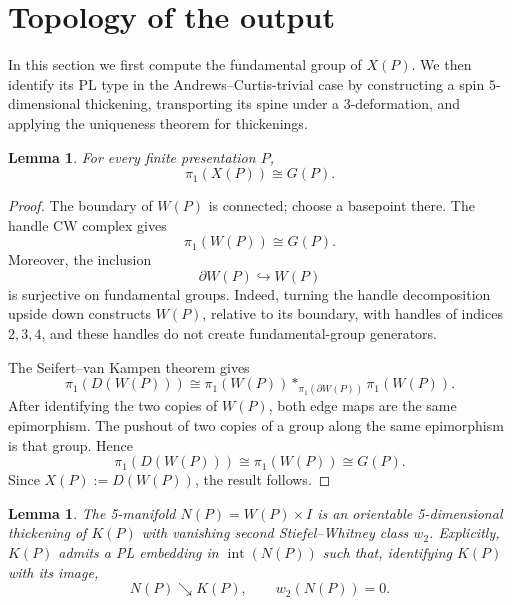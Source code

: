\documentclass[a4paper,11pt,reqno]{amsart}
\newtheorem{lemma}[theorem]{Lemma}
\theoremstyle{definition}
\theoremstyle{remark}
\begin{document}
	\section{Topology of the output}
	\label{sec:output-topology}
	
	In this section we first compute the fundamental group of $X(P)$. We then identify its PL type in the Andrews–Curtis-trivial case by constructing a spin $5$-dimensional thickening, transporting its spine under a $3$-deformation, and applying the uniqueness theorem for thickenings.
	
	\begin{lemma}
		\label{lem:pi1-double}
		For every finite presentation $P$,
		\[
		\pi_1(X(P))\cong G(P).
		\]
	\end{lemma}
	
	\begin{proof}
		The boundary of $W(P)$ is connected; choose a basepoint there. The handle
		CW complex gives
		\[
		\pi_1(W(P))\cong G(P).
		\]
		Moreover, the inclusion
		\[
		\partial W(P)\hookrightarrow W(P)
		\]
		is surjective on fundamental groups. Indeed, turning the handle decomposition
		upside down constructs $W(P)$, relative to its boundary, with handles of
		indices $2,3,4$, and these handles do not create fundamental-group
		generators.
		
		The Seifert--van Kampen theorem gives
		\[
		\pi_1(D(W(P)))
		\cong
		\pi_1(W(P))*_{\pi_1(\partial W(P))}\pi_1(W(P)).
		\]
		After identifying the two copies of $W(P)$, both edge maps are the same
		epimorphism. The pushout of two copies of a group along the same epimorphism
		is that group. Hence
		\[
		\pi_1(D(W(P)))\cong\pi_1(W(P))\cong G(P).
		\]
		Since $X(P):=D(W(P))$, the result follows.
	\end{proof}
	
	\begin{lemma}
		\label{lem:zero-w2-product}
		The 5-manifold $N(P)=W(P)\times I$ is an orientable 5-dimensional thickening of $K(P)$ with vanishing second Stiefel--Whitney class $w_2$. Explicitly, $K(P)$ admits a PL embedding in $\operatorname{int}(N(P))$ such that, identifying $K(P)$ with its image,
		\[N(P)\searrow K(P),\qquad w_2(N(P))=0.\]
	\end{lemma}
	
\end{document}
